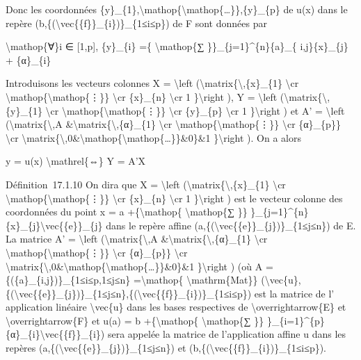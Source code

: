 \documentclass[]{article}
\begin{document}
Donc les coordonnées
\{y\}\_\{1\},\textbackslash{}mathop\{\textbackslash{}mathop\{\ldots{}\}\},\{y\}\_\{p\}
de u(x) dans le repère
(b,\{(\textbackslash{}vec\{\{f\}\}\_\{i\})\}\_\{1≤i≤p\}) de F sont
données par

\textbackslash{}mathop\{∀\}i ∈ {[}1,p{]}, \{y\}\_\{i\} =\{
\textbackslash{}mathop\{∑ \}\}\_\{j=1\}\^{}\{n\}\{a\}\_\{
i,j\}\{x\}\_\{j\} + \{α\}\_\{i\}

Introduisons les vecteurs colonnes X = \textbackslash{}left
(\textbackslash{}matrix\{\textbackslash{},\{x\}\_\{1\}
\textbackslash{}cr \textbackslash{}mathop\{\textbackslash{}mathop\{⋮\}\}
\textbackslash{}cr \{x\}\_\{n\} \textbackslash{}cr 1
\}\textbackslash{}right ), Y = \textbackslash{}left
(\textbackslash{}matrix\{\textbackslash{},\{y\}\_\{1\}
\textbackslash{}cr \textbackslash{}mathop\{\textbackslash{}mathop\{⋮\}\}
\textbackslash{}cr \{y\}\_\{p\} \textbackslash{}cr 1
\}\textbackslash{}right ) et A' = \textbackslash{}left
(\textbackslash{}matrix\{\textbackslash{},A
\&\textbackslash{}matrix\{\textbackslash{},\{α\}\_\{1\}
\textbackslash{}cr \textbackslash{}mathop\{\textbackslash{}mathop\{⋮\}\}
\textbackslash{}cr \{α\}\_\{p\}\} \textbackslash{}cr
\textbackslash{}matrix\{\textbackslash{},0\&\textbackslash{}mathop\{\textbackslash{}mathop\{\ldots{}\}\}\&0\}\&1
\}\textbackslash{}right ). On a alors

y = u(x) \textbackslash{}mathrel\{⇔\} Y = A'X

Définition~17.1.10 On dira que X = \textbackslash{}left
(\textbackslash{}matrix\{\textbackslash{},\{x\}\_\{1\}
\textbackslash{}cr \textbackslash{}mathop\{\textbackslash{}mathop\{⋮\}\}
\textbackslash{}cr \{x\}\_\{n\} \textbackslash{}cr 1
\}\textbackslash{}right ) est le vecteur colonne des coordonnées du
point x = a +\{\textbackslash{}mathop\{ \textbackslash{}mathop\{∑ \}\}
\}\_\{j=1\}\^{}\{n\}\{x\}\_\{j\}\textbackslash{}vec\{\{e\}\}\_\{j\} dans
le repère affine
(a,\{(\textbackslash{}vec\{\{e\}\}\_\{j\})\}\_\{1≤j≤n\}) de E. La
matrice A' = \textbackslash{}left
(\textbackslash{}matrix\{\textbackslash{},A
\&\textbackslash{}matrix\{\textbackslash{},\{α\}\_\{1\}
\textbackslash{}cr \textbackslash{}mathop\{\textbackslash{}mathop\{⋮\}\}
\textbackslash{}cr \{α\}\_\{p\}\} \textbackslash{}cr
\textbackslash{}matrix\{\textbackslash{},0\&\textbackslash{}mathop\{\textbackslash{}mathop\{\ldots{}\}\}\&0\}\&1
\}\textbackslash{}right ) (où A = \{(\{a\}\_\{i,j\})\}\_\{1≤i≤p,1≤j≤n\}
=\textbackslash{}mathop\{ \textbackslash{}mathrm\{Mat\}\}
(\textbackslash{}vec\{u\},\{(\textbackslash{}vec\{\{e\}\}\_\{j\})\}\_\{1≤j≤n\},\{(\textbackslash{}vec\{\{f\}\}\_\{i\})\}\_\{1≤i≤p\})
est la matrice de l' application linéaire \textbackslash{}vec\{u\} dans
les bases respectives de \textbackslash{}overrightarrow\{E\} et
\textbackslash{}overrightarrow\{F\} et u(a) = b
+\{\textbackslash{}mathop\{ \textbackslash{}mathop\{∑ \}\}
\}\_\{i=1\}\^{}\{p\}\{α\}\_\{i\}\textbackslash{}vec\{\{f\}\}\_\{i\})
sera appelée la matrice de l'application affine u dans les repères
(a,\{(\textbackslash{}vec\{\{e\}\}\_\{j\})\}\_\{1≤j≤n\}) et
(b,\{(\textbackslash{}vec\{\{f\}\}\_\{i\})\}\_\{1≤i≤p\}).
\end{document}
